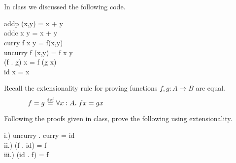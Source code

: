 \documentclass[11pt]{article}
\begin{document}

\section{}

\noindent{}In class we discussed the following code.

\begin{program**}
\>     addp (x,y) = x + y \\
\>     addc x y = x + y \\
\>     curry f x y  =  f(x,y) \\
\>     uncurry f (x,y) = f x y \\
\>     (f . g) x = f (g x) \\
\>     id x = x \\
\end{program**}

\noindent{}Recall the extensionality rule for proving functions $f,g:A\rightarrow{}B$ are equal.
\[ f = g \;{\stackrel{\rm def}{=}}\; \forall{}x:A. \;f x = g x \hspace{2.5in} \]

\noindent{}Following the proofs given in class, prove the following using extensionality.

\begin{program**}
\>       {\rm{i.)}}  uncurry . curry  = id \\
\>       {\rm{ii.)}}  (f . id) = f \\
\>       {\rm{iii.)}}  (id . f) = f 
\end{program**}
\end{document}
